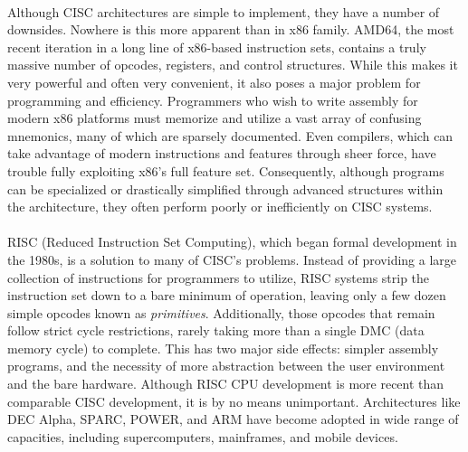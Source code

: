 \documentclass[english]{paper}
\begin{document}
\paragraph{}
Although CISC architectures are simple to implement, they have a number of downsides. Nowhere is this more apparent than in x86 family. AMD64, the most recent iteration in a long line of x86-based instruction sets, contains a truly massive number of opcodes, registers, and control structures. While this makes it very powerful and often very convenient, it also poses a major problem for programming and efficiency. Programmers who wish to write assembly for modern x86 platforms must memorize and utilize a vast array of confusing mnemonics, many of which are sparsely documented. Even compilers, which can take advantage of modern instructions and features through sheer force, have trouble fully exploiting x86's full feature set. Consequently, although programs can be specialized or drastically simplified through advanced structures within the architecture, they often perform poorly or inefficiently on CISC systems. 

\paragraph{}
RISC (Reduced Instruction Set Computing), which began formal development in the 1980s, is a solution to many of CISC's problems. Instead of providing a large collection of instructions for programmers to utilize, RISC systems strip the instruction set down to a bare minimum of operation, leaving only a few dozen simple opcodes known as \textit{primitives}. Additionally, those opcodes that remain follow strict cycle restrictions, rarely taking more than a single DMC (data memory cycle) to complete. This has two major side effects: simpler assembly programs, and the necessity of more abstraction between the user environment and the bare hardware. Although RISC CPU development is more recent than comparable CISC development, it is by no means unimportant. Architectures like DEC Alpha, SPARC, POWER, and ARM have become adopted in wide range of capacities, including supercomputers, mainframes, and mobile devices.
\end{document}

